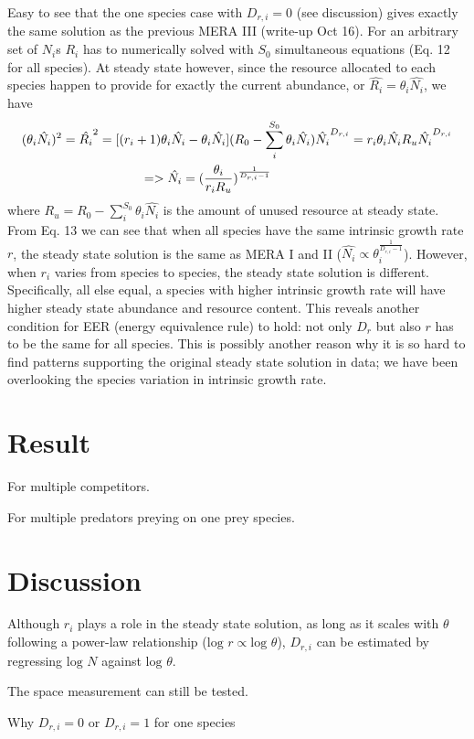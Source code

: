 \documentclass[12pt]{article}
\begin{document}
Easy to see that the one species case with $D_{r,i}=0$ (see discussion) gives exactly the same solution as the previous MERA III (write-up Oct 16). For an arbitrary set of $N_i$s $R_i$ has to numerically solved with $S_0$ simultaneous equations (Eq. 12 for all species). At steady state however, since the resource allocated to each species happen to provide for exactly the current abundance, or  $\hat{R_i} = \theta_i \hat{N_i}$, we have
  \begin{equation}
   \begin{split}
(\theta_i \hat{N_i})^2 =\hat{R_i}^2=  [(r_i+1)\theta_i \hat{N_i} -\theta_i \hat{N_i}](R_0 -\sum_i^{S_0}\theta_i \hat{N_i}) \hat{N_i} ^{D_{r,i}}
= r_i \theta_i \hat{N_i} R_u \hat{N_i} ^{D_{r,i}} \\
=> \hat{N_i} = (\frac{\theta_i}{r_i R_u})^{\frac{1}{D_{r,i}-1}}\hskip 5cm
\end{split}
\end{equation}
where $R_u = R_0 -\sum_i^{S_0}\theta_i \hat{N_i}$ is the amount of unused resource at steady state. From Eq. 13 we can see that when all species have the same intrinsic growth rate $r$, the steady state solution is the same as MERA I and II ($ \hat{N_i} \propto  \theta_i ^{\frac{1}{D_{r,i}-1}}$). However, when $r_i$ varies from species to species, the steady state solution is different. Specifically, all else equal, a species with higher intrinsic growth rate will have higher steady state abundance and resource content. This reveals another condition for EER (energy equivalence rule) to hold: not only $D_r$ but also $r$ has to be the same for all species. This is possibly another reason why it is so hard to find patterns supporting the original steady state solution in data; we have been overlooking the species variation in intrinsic growth rate.

\section{Result}
For multiple competitors.

For multiple predators preying on one prey species.

\section{Discussion}
Although $r_i$ plays a role in the steady state solution, as long as it scales with $\theta$ following a power-law relationship ($\mbox{log }r \propto \mbox{log }\theta$), $D_{r,i}$ can be estimated by regressing $\mbox{log }N$ against $\mbox{log }\theta$.

The space measurement can still be tested.


Why $D_{r,i}=0$ or $D_{r,i}=1$ for one species 
\end{document}
